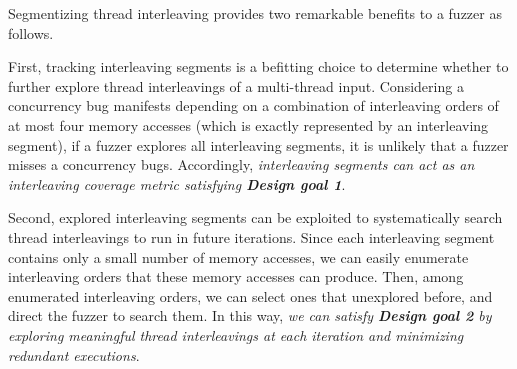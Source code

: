 



%
Segmentizing thread interleaving provides two remarkable benefits to a
fuzzer as follows.



First, tracking interleaving segments is a befitting choice to
determine whether to further explore thread interleavings of a
multi-thread input.
%
%
Considering a concurrency bug manifests depending on a combination of
interleaving orders of at most four memory accesses (which is exactly
represented by an interleaving segment), if a fuzzer explores all
interleaving segments, it is unlikely that a fuzzer misses a
concurrency bugs.
%
Accordingly, \textit{interleaving segments can act as an
  interleaving coverage metric satisfying \textbf{Design goal 1}}.






Second, explored interleaving segments can be exploited to
systematically search thread interleavings to run in future
iterations.
%
Since each interleaving segment contains only a small number of memory
accesses, we can easily enumerate interleaving orders that these
memory accesses can produce.
%
Then, among enumerated interleaving orders, we can select ones that
unexplored before, and direct the fuzzer to search them.
%
In this way, \textit{we can satisfy \textbf{Design goal 2} by
  exploring meaningful thread interleavings at each iteration and
  minimizing redundant executions}.


